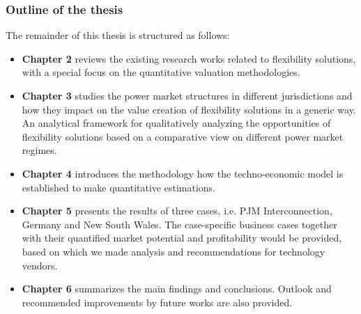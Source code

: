 \subsubsection{Outline of the thesis}

The remainder of this thesis is structured as follows: 

\begin{itemize}
	\item \textbf{Chapter 2} reviews the existing research works related to flexibility solutions, with a special focus on the quantitative valuation methodologies.
	\item \textbf{Chapter 3} studies the power market structures in different jurisdictions and how they impact on the value creation of flexibility solutions in a generic way. An analytical framework for qualitatively analyzing the opportunities of flexibility solutions based on a comparative view on different power market regimes.
	\item \textbf{Chapter 4} introduces the methodology how the techno-economic model is established to make quantitative estimations.
	\item \textbf{Chapter 5} presents the results of three cases, i.e. PJM Interconnection, Germany and New South Wales. The case-specific business cases together with their quantified market potential and profitability would be provided, based on which we made analysis and recommendations for technology vendors.
	\item \textbf{Chapter 6} summarizes the main findings and conclusions. Outlook and recommended improvements by future works are also provided.
\end{itemize}
